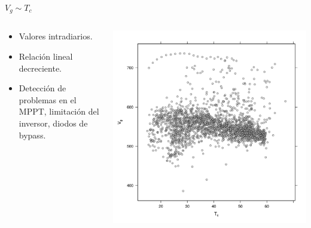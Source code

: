 \documentclass[aspectratio=169, usenames,svgnames,dvipsnames]{beamer}
\begin{document}
\begin{frame}[label={sec:org2df4ebc}]{\(V_g \sim T_c\)}
\begin{columns}
\begin{column}{0.3\columnwidth}
\begin{itemize}
\item Valores intradiarios.
\item Relación lineal decreciente.
\item Detección de problemas en el MPPT, limitación del inversor, diodos de bypass.
\end{itemize}
\end{column}

\begin{column}{0.7\columnwidth}
\begin{center}
\includegraphics[height=0.95\textheight]{../figs/VgTc.pdf}
\end{center}
\end{column}
\end{columns}
\end{frame}
\end{document}
